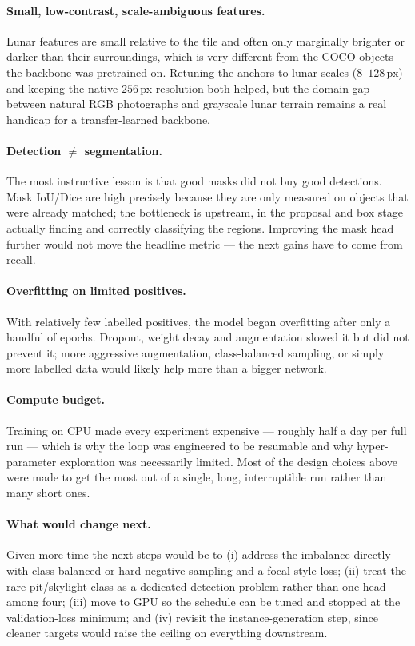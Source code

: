 \documentclass{aa}
\begin{document}
\paragraph{Small, low-contrast, scale-ambiguous features.}
Lunar features are small relative to the tile and often only marginally brighter or
darker than their surroundings, which is very different from the COCO objects the
backbone was pretrained on. Retuning the anchors to lunar scales ($8$--$128$\,px)
and keeping the native $256$\,px resolution both helped, but the domain gap between
natural RGB photographs and grayscale lunar terrain remains a real handicap for a
transfer-learned backbone.

\paragraph{Detection $\neq$ segmentation.}
The most instructive lesson is that good masks did not buy good detections. Mask
IoU/Dice are high precisely because they are only measured on objects that were
already matched; the bottleneck is upstream, in the proposal and box stage actually
finding and correctly classifying the regions. Improving the mask head further would
not move the headline metric --- the next gains have to come from recall.

\paragraph{Overfitting on limited positives.}
With relatively few labelled positives, the model began overfitting after only a
handful of epochs. Dropout, weight decay and augmentation
slowed it but did not prevent it; more aggressive augmentation, class-balanced
sampling, or simply more labelled data would likely help more than a bigger network.

\paragraph{Compute budget.}
Training on CPU made every experiment expensive --- roughly half a day per full run
--- which is why the loop was engineered to be resumable and why hyper-parameter
exploration was necessarily limited. Most of the design choices above were made to
get the most out of a single, long, interruptible run rather than many short ones.

\paragraph{What would change next.}
Given more time the next steps would be to (i) address the imbalance directly with
class-balanced or hard-negative sampling and a focal-style loss; (ii) treat the rare
pit/skylight class as a dedicated detection problem rather than one head among four;
(iii) move to GPU so the schedule can be tuned and stopped at the validation-loss
minimum; and (iv) revisit the instance-generation step, since cleaner targets would
raise the ceiling on everything downstream.
\end{document}
